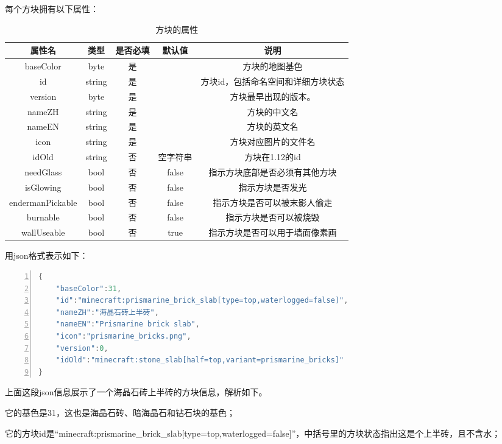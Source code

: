 \documentclass[UTF8]{ctexart}
\begin{document}
   每个方块拥有以下属性：
   \begin{table}[h]
    \centering
    \caption{方块的属性}
    \begin{tabular}{ccccc}
        \hline
        属性名 & 类型 & 是否必填 & 默认值 & 说明  \\ \hline
        baseColor & byte & 是 & & 方块的地图基色 \\
        id & string & 是 & & 方块id，包括命名空间和详细方块状态\\
        version & byte & 是 & & 方块最早出现的版本。 \\
        nameZH & string & 是 & & 方块的中文名 \\
        nameEN & string & 是 & & 方块的英文名 \\
        icon & string & 是 & & 方块对应图片的文件名 \\
        idOld & string & 否 & 空字符串 & 方块在1.12的id \\
        needGlass & bool & 否 & false & 指示方块底部是否必须有其他方块 \\
        isGlowing & bool & 否 & false & 指示方块是否发光 \\
        endermanPickable & bool & 否 & false & 指示方块是否可以被末影人偷走 \\
        burnable & bool & 否 & false & 指示方块是否可以被烧毁 \\
        wallUseable & bool & 否 & true & 指示方块是否可以用于墙面像素画 \\
        \hline 
    \end{tabular}       
   \end{table}
   
   \clearpage
   用json格式表示如下：
\begin{lstlisting}[language = C++, numbers=left, 
    numberstyle=\tiny,keywordstyle=\color{blue!70},
    commentstyle=\color{red!50!green!50!blue!50},frame=shadowbox,
    rulesepcolor=\color{red!20!green!20!blue!20},basicstyle=\ttfamily]
{
    "baseColor":31,
    "id":"minecraft:prismarine_brick_slab[type=top,waterlogged=false]",
    "nameZH":"海晶石砖上半砖",
    "nameEN":"Prismarine brick slab",
    "icon":"prismarine_bricks.png",
    "version":0,
    "idOld":"minecraft:stone_slab[half=top,variant=prismarine_bricks]"
}
    \end{lstlisting}
    上面这段json信息展示了一个海晶石砖上半砖的方块信息，解析如下。

    
    它的基色是31，这也是海晶石砖、暗海晶石和钻石块的基色；
    
    它的方块id是“minecraft:prismarine\_brick\_slab[type=top,waterlogged=false]”，中括号里的方块状态指出这是个上半砖，且不含水；
    
\end{document}
